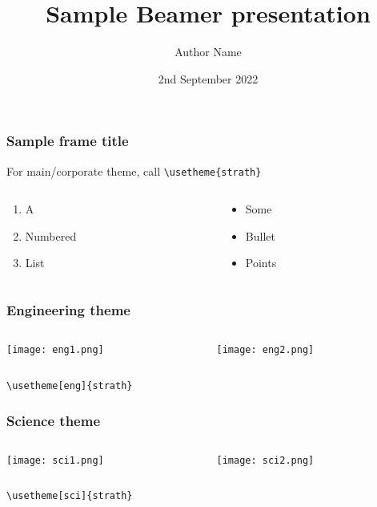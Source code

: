 \documentclass[aspectratio=1610]{beamer}
\title[Sample presentation]{Sample Beamer presentation}
\author[Author]{Author Name}
\institute{University of Strathclyde}
\date[2/9/22]{2nd September 2022}
\begin{document}
\frame{\titlepage}

\begin{frame}
	\frametitle{Sample frame title}
	For main/corporate theme, call \texttt{\textbackslash{}usetheme\{strath\}}
	\vspace{1cm}
	\begin{columns}
		\begin{column}{0.47\textwidth}
			\begin{enumerate}
				\item A
				\item Numbered
				\item List
			\end{enumerate}
		\end{column}
		\begin{column}{0.47\textwidth}
			\begin{itemize}
				\item Some
				\item Bullet
				\item Points
			\end{itemize}
		\end{column}
	\end{columns}
\end{frame}

\begin{frame}
	\frametitle{Engineering theme}
	\begin{columns}
		\begin{column}{0.47\textwidth}
			\texttt{[image: eng1.png]}
		\end{column}
		\begin{column}{0.47\textwidth}
			\texttt{[image: eng2.png]}
		\end{column}
	\end{columns}
	\vspace{1cm}
	\centering
	\texttt{\textbackslash{}usetheme[eng]\{strath\}}
\end{frame}

\begin{frame}
	\frametitle{Science theme}
	\begin{columns}
		\begin{column}{0.47\textwidth}
			\texttt{[image: sci1.png]}
		\end{column}
		\begin{column}{0.47\textwidth}
			\texttt{[image: sci2.png]}
		\end{column}
	\end{columns}
	\vspace{1cm}
	\centering
	\texttt{\textbackslash{}usetheme[sci]\{strath\}}
\end{frame}
\end{document}

